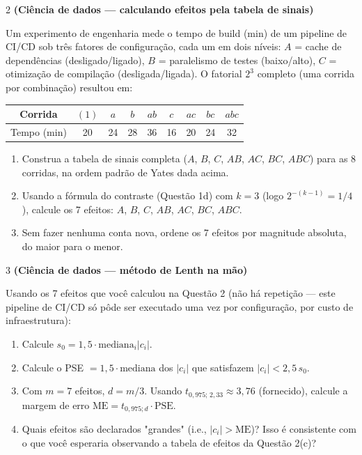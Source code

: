 \documentclass[11pt]{article}
\begin{document}
\begin{questao}{2} \textbf{(Ciência de dados --- calculando efeitos pela tabela de sinais)}

Um experimento de engenharia mede o tempo de build (min) de um pipeline de CI/CD sob três fatores
de configuração, cada um em dois níveis: $A$ = cache de dependências (desligado/ligado), $B$ =
paralelismo de testes (baixo/alto), $C$ = otimização de compilação (desligada/ligada). O fatorial
$2^3$ completo (uma corrida por combinação) resultou em:

\begin{center}
\begin{tabular}{c|cccccccc}
Corrida & $(1)$ & $a$ & $b$ & $ab$ & $c$ & $ac$ & $bc$ & $abc$ \\ \hline
Tempo (min) & 20 & 24 & 28 & 36 & 16 & 20 & 24 & 32
\end{tabular}
\end{center}

\begin{enumerate}[label=(\alph*)]
  \item Construa a tabela de sinais completa ($A$, $B$, $C$, $AB$, $AC$, $BC$, $ABC$) para as 8
    corridas, na ordem padrão de Yates dada acima.
  \item Usando a fórmula do contraste (Questão 1d) com $k=3$ (logo $2^{-(k-1)}=1/4$), calcule os
    7 efeitos: $A$, $B$, $C$, $AB$, $AC$, $BC$, $ABC$.
  \item Sem fazer nenhuma conta nova, ordene os 7 efeitos por magnitude absoluta, do maior para o
    menor.
\end{enumerate}
\end{questao}

\begin{questao}{3} \textbf{(Ciência de dados --- método de Lenth na mão)}

Usando os 7 efeitos que você calculou na Questão 2 (não há repetição — este pipeline de CI/CD
só pôde ser executado uma vez por configuração, por custo de infraestrutura):

\begin{enumerate}[label=(\alph*)]
  \item Calcule $s_0 = 1{,}5\cdot\text{mediana}_i|c_i|$.
  \item Calcule o PSE $=1{,}5\cdot\text{mediana}$ dos $|c_i|$ que satisfazem $|c_i| < 2{,}5\,s_0$.
  \item Com $m=7$ efeitos, $d=m/3$. Usando $t_{0{,}975;\,2{,}33}\approx3{,}76$ (fornecido), calcule
    a margem de erro $\text{ME} = t_{0{,}975;d}\cdot\text{PSE}$.
  \item Quais efeitos são declarados "grandes" (i.e., $|c_i|>\text{ME}$)? Isso é consistente com o
    que você esperaria observando a tabela de efeitos da Questão 2(c)?
\end{enumerate}
\end{questao}
\end{document}
